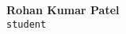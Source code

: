 \documentclass[a4paper,10pt]{article}
\begin{document}
\pagestyle{empty}
\begin{center}
\textbf{\LARGE Rohan Kumar Patel}\\[0.5em]
\texttt{student}
\end{center}
\end{document}
